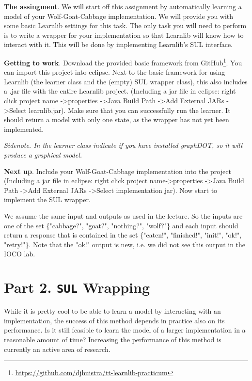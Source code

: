 \documentclass[a4paper]{article}
\begin{document}
\textbf{The assingment}. We will start off this assignment by automatically learning a model of your Wolf-Goat-Cabbage implementation. We will provide you with some basic Learnlib settings for this task. The only task you will need to perform is to write a wrapper for your implementation so that Learnlib will know how to interact with it.  This will be done by implementing Learnlib's SUL interface.

\textbf{Getting to work}. Download the provided basic framework from GitHub\footnote{\url{https://github.com/djhuistra/tt-learnlib-practicum}}. You can import this project into eclipse. Next to the basic framework for using Learnlib (the learner class and the (empty) SUL wrapper class), this also includes a .jar file with the entire Learnlib project. (Including a jar file in eclipse: right click project name  -\textgreater properties  -\textgreater Java Build Path -\textgreater Add External JARs -\textgreater Select learnlib.jar). Make sure that you can successfully run the learner. It should return a model with only one state, as the wrapper has not yet been implemented.

\emph{Sidenote. In the learner class indicate if you have installed graphDOT, so it will produce a graphical model.}

\textbf{Next up}. Include your Wolf-Goat-Cabbage implementation into the project (Including a jar file in eclipse: right click project name-\textgreater properties  -\textgreater Java Build Path  -\textgreater  Add External JARs  -\textgreater  Select implementation jar). Now start to implement the SUL wrapper. 

We assume the same input and outputs as used in the lecture. So the inputs are one of the set \{"cabbage?", "goat?", "nothing?", "wolf?"\} and each input should return a response that is contained in the set \{"eaten!", "finished!", "init!", "ok!", "retry!"\}. Note that the "ok!" output is new, i.e. we did not see this output in the IOCO lab.

\section*{Part 2. \texttt{SUL} Wrapping}


While it is pretty cool to be able to learn a model by interacting with an implementation, the success of this method depends in practice also on its performance. Is it still feasible to learn the model of a larger implementation in a reasonable amount of time? Increasing the performance of this method is currently an active area of research.
\end{document}
